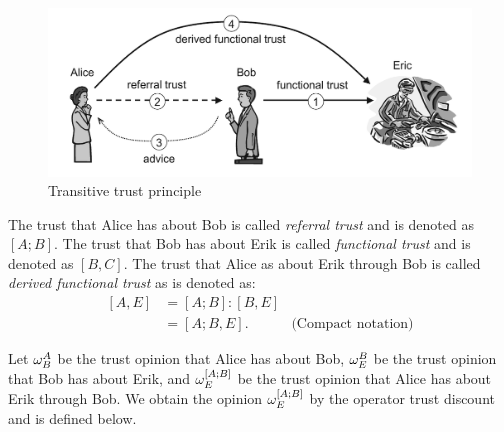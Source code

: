 \documentclass[a4paper,12pt]{article}
\theoremstyle{definition}
\numberwithin{equation}{section}
\begin{document}
\begin{figure}[htb]
	\centering
	\includegraphics[scale=0.4]{images/transitive-trust-principle.png}
	\caption{Transitive trust principle}
\end{figure}

The trust that Alice has about Bob is called \emph{referral trust} and is denoted as $[A; B]$. The trust that Bob has about Erik is called \emph{functional trust} and is denoted as $[B, C]$. The trust that Alice as about Erik through Bob is called \emph{derived functional trust} as is denoted as:
\begin{equation}
	\begin{array}{rll}
		[A, E] & = [A; B] : [B, E] \\
		& = [A; B, E] \text{.} & \text{(Compact notation)}
	\end{array}
\end{equation}

Let $\omega^{A}_{B}$ be the trust opinion that Alice has about Bob, $\omega^{B}_{E}$ be the trust opinion that Bob has about Erik, and $\omega^{[A;B]}_{E}$ be the trust opinion that Alice has about Erik through Bob. We obtain the opinion $\omega^{[A;B]}_{E}$ by the operator trust discount and is defined below.
\end{document}
